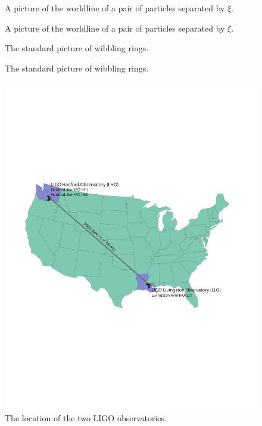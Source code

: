 \newpage

\begin{figure}[p]
\begin{center}
A picture of the worldline of a pair of particles separated by $\xi$.
\end{center}
\caption{\label{f:particles}%
A picture of the worldline of a pair of particles separated by $\xi$.
}
\end{figure}

\begin{figure}[p]
\begin{center}
The standard picture of wibbling rings.
\end{center}
\caption{\label{f:rings}%
The standard picture of wibbling rings.
}
\end{figure}

\begin{figure}[p]
\begin{center}
\includegraphics[width=\linewidth]{figures/inspiral/observatories}
\end{center}
\caption{\label{f:usmap}%
The location of the two LIGO observatories.
}
\end{figure}

